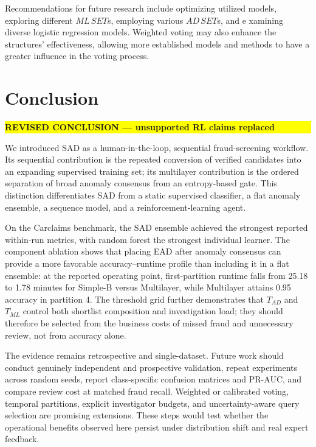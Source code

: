 \documentclass[12pt]{article}
\newcommand{\revmark}[1]{\par\noindent\colorbox{yellow}{%
  \parbox{\dimexpr\linewidth-2\fboxsep}{\raggedright\strut\textbf{#1}}}%
  \par\smallskip}
\begin{document}
Recommendations for future research include optimizing utilized
models, exploring different $ML\, SET$s, employing various $AD\, SET $s, and e	xamining diverse logistic regression models. Weighted
voting may also enhance the structures' effectiveness, allowing
more established models and methods to have a greater influence in
the voting process.
\fi

\section{Conclusion}\label{SC:CONCLUSION}
\revmark{REVISED CONCLUSION --- unsupported RL claims replaced}
We introduced SAD as a human-in-the-loop, sequential fraud-screening workflow.
Its sequential contribution is the repeated conversion of verified candidates
into an expanding supervised training set; its multilayer contribution is the
ordered separation of broad anomaly consensus from an entropy-based gate. This
distinction differentiates SAD from a static supervised classifier, a flat
anomaly ensemble, a sequence model, and a reinforcement-learning agent.

On the Carclaims benchmark, the SAD ensemble achieved the strongest reported
within-run metrics, with random forest the strongest individual learner. The
component ablation shows that placing EAD after anomaly consensus can provide a
more favorable accuracy--runtime profile than including it in a flat ensemble:
at the reported operating point, first-partition runtime falls from 25.18 to
1.78 minutes for Simple-B versus Multilayer, while Multilayer attains 0.95
accuracy in partition 4. The threshold grid further demonstrates that
$T_{AD}$ and $T_{ML}$ control both shortlist composition and investigation
load; they should therefore be selected from the business costs of missed fraud
and unnecessary review, not from accuracy alone.

The evidence remains retrospective and single-dataset. Future work should
conduct genuinely independent and prospective validation, repeat experiments
across random seeds, report class-specific confusion matrices and PR-AUC, and
compare review cost at matched fraud recall. Weighted or calibrated voting,
temporal partitions, explicit investigator budgets, and uncertainty-aware
query selection are promising extensions. These steps would test whether the
operational benefits observed here persist under distribution shift and real
expert feedback.

\baselineskip12pt

\end{document}
